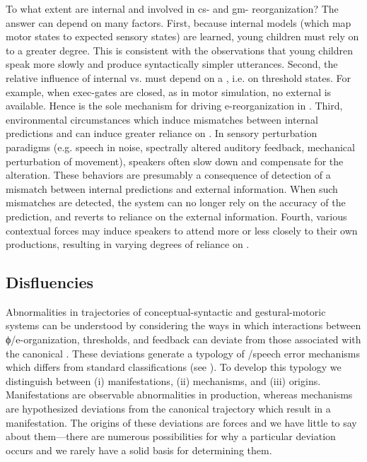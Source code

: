   To what extent are internal and  involved in cs- and gm- reorganization? The answer can depend on many factors. First, because internal models (which map motor states to expected sensory states) are learned, young children must rely on  to a greater degree. This is consistent with the observations that young children speak more slowly and produce syntactically simpler utterances. Second, the relative influence of internal vs.  must depend on a , i.e. on threshold states. For example, when exec-gates are closed, as in motor simulation, no external  is available. Hence  is the sole mechanism for driving e-reorganization in . Third, environmental circumstances which induce mismatches between internal predictions and  can induce greater reliance on . In sensory perturbation paradigms (e.g. speech in noise, spectrally altered auditory feedback, mechanical perturbation of movement), speakers often slow down and compensate for the alteration. These behaviors are presumably a consequence of detection of a mismatch between internal predictions and external information. When such mismatches are detected, the system can no longer rely on the accuracy of the prediction, and reverts to reliance on the external information. Fourth, various contextual forces may induce speakers to attend more or less closely to their own productions, resulting in varying degrees of reliance on .

\subsection{Disfluencies}

Abnormalities in trajectories of conceptual-syntactic and gestural-motoric systems can be understood by considering the ways in which interactions between ϕ/e-organization, thresholds, and feedback can deviate from those associated with the canonical . These deviations generate a typology of /speech error mechanisms which differs from standard classifications (see \citealt{Fromkin1971,Fromkin1984,Shriberg2001}). To develop this typology we distinguish between (i)  manifestations, (ii)  mechanisms, and (iii)  origins. Manifestations are observable abnormalities in production, whereas mechanisms are hypothesized deviations from the canonical trajectory which result in a  manifestation. The origins of these deviations are  forces and we have little to say about them—there are numerous possibilities for why a particular deviation occurs and we rarely have a solid basis for determining them. 

